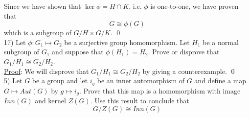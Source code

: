 \documentclass{article}
\begin{document}
Since we have shown that $\ker \phi = H \cap K$, i.e. $\phi$ is one-to-one, we have proven that 
$$G \cong \phi(G)$$
which is a subgroup of $G/H \times G/K$. \qed \\

17) Let $\phi : G_1 \mapsto G_2$ be a surjective group homomorphism. Let $H_1$ be a normal subgroup of $G_1$ and suppose that $\phi(H_1) = H_2$. Prove or disprove that $G_1/H_1 \cong G_2/H_2$. \\

\underline{Proof}: We will disprove that $G_1/H_1 \cong G_2/H_2$ by giving a counterexample.  \qed \\

5) Let $G$ be a group and let $i_g$ be an inner automorphism of $G$ and define a map $G \mapsto Aut(G)$ by $g \mapsto i_g$. Prove that this map is a homomorphism with image $Inn(G)$ and kernel $Z(G)$. Use this result to conclude that 
$$G/Z(G) \cong Inn(G)$$
\end{document}
